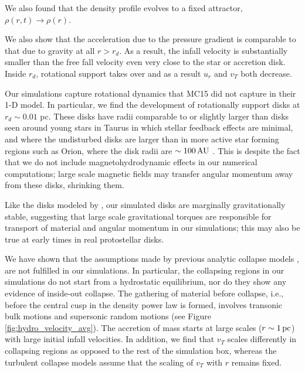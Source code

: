\documentclass[../dissertation.tex]{subfiles}
\begin{document}
We also found that the density profile evolves
to a fixed attractor, $\rho(r,t ) \rightarrow \rho(r)$. 

We also show that the acceleration 
due to the pressure gradient is comparable to that due to gravity at all $r>r_d$. 
As a result, the infall velocity is substantially smaller than the free fall velocity
even very close to the star or accretion disk. Inside $r_d$, rotational support takes over 
and as a result $u_r$ and $v_T$ both decrease.  

Our simulations capture rotational dynamics that MC15 did not capture in their 1-D model.  
In particular, we find the development of rotationally support disks at $r_d \sim 0.01$ pc.  
These disks have radii comparable to  or slightly larger than disks seen around 
young stars in Taurus \citep{1999AJ....117.1490P} in which stellar feedback effects are minimal,
and where the undisturbed disks are larger than in more active star forming regions such as Orion, 
where the disk radii are $\sim 100\,\rm AU$ \citep{2011ARA&A..49...67W}.  
This is despite the fact that we do not include magnetohydrodynamic effects 
in our numerical computations;  large scale magnetic fields may transfer angular 
momentum away from these disks, shrinking them.  

Like the disks modeled by \citet{2010ApJ...708.1585K},
our simulated disks are 
marginally gravitationally stable, suggesting that large scale gravitational torques are 
responsible for transport of material and angular momentum in our simulations; this may
also be true at early times in real protostellar disks.  

We have shown that the assumptions made by previous analytic collapse models
\citep{1977ApJ...214..488S,1992ApJ...396..631M,1997ApJ...476..750M,2003ApJ...585..850M}, 
are not fulfilled in our simulations.  In particular, 
the collapsing regions in our simulations do not start from a hydrostatic equilibrium, nor 
do they show any evidence of inside-out collapse.  The gathering of material before collapse, i.e.,
before the central cusp in the density power law is formed, involves transonic bulk motions 
and supersonic random motions (see Figure \ref{fig:hydro_velocity_avg}). The accretion of mass starts at large 
scales ($r\sim 1\,\rm pc$) with large initial infall velocities.  In addition, we find that $v_T$ 
scales differently in collapsing regions as opposed to the rest of the simulation box, 
whereas the turbulent collapse models \citep{1997ApJ...476..750M,2003ApJ...585..850M} assume 
that the scaling of $v_T$ with $r$ remains fixed.  
\end{document}
